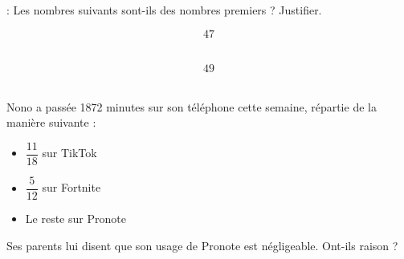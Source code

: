  : Les nombres suivants sont-ils des nombres premiers ? Justifier.

\begin{multicols}{2}
    $$47$$\\[-1cm]

    $$49$$\\[-1cm]
\end{multicols}

 Nono a passée 1872 minutes sur son téléphone cette semaine, répartie de la manière suivante :
\begin{itemize}
    \item $\dfrac{11}{18}$ sur TikTok
    \item $\dfrac{5}{12}$ sur Fortnite
    \item Le reste sur Pronote
\end{itemize}

Ses parents lui disent que son usage de Pronote est négligeable. Ont-ils raison ?
